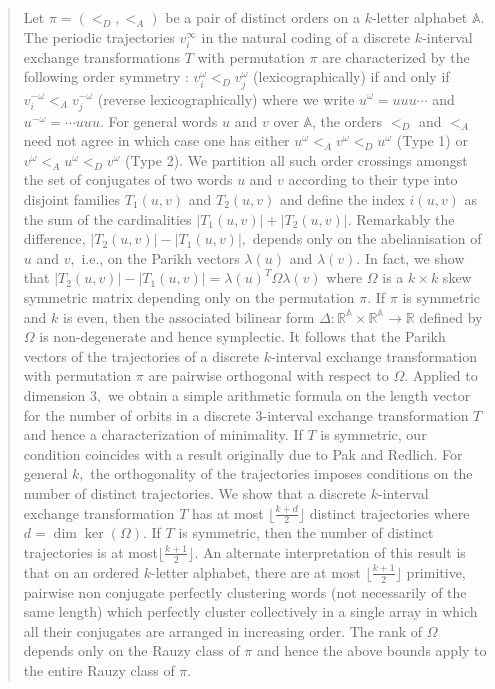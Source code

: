 \documentclass[12pt,a4paper]{amsart}
\newcommand{\reals}{{\mathbb R}}
\newcommand{\A}{{\mathbb A}}
\begin{document}
\begin{abstract} {Let $\pi=(<_D,<_A)$ be a pair of distinct orders on a $k$-letter alphabet $\A. $  The periodic trajectories $v_i^\infty $ in the natural coding of a discrete $k$-interval exchange transformations $T$ with permutation $\pi$ are characterized by the following order symmetry : $v_i^\omega <_D v_j^\omega$ (lexicographically) if and only if $v_i^{-\omega}<_Av_j^{-\omega}$ (reverse lexicographically) where we write $u^\omega=uuu\cdots$ and $u^{-\omega}=\cdots uuu.$   
For general words $u$ and $v$ over $\A$, the orders $<_D$ and $<_A$ need not agree in which case one has either $u^\omega<_A v^\omega<_D u^\omega$ (Type 1) or $v^\omega<_A u^\omega<_D v^\omega$ (Type 2).  We partition all such order crossings  amongst the set of conjugates of two words $u$ and $v$  according to their type into disjoint families  $T_1(u,v)$ and $T_2(u,v)$ and define the index $i(u,v)$ as the sum of the cardinalities $|T_1(u,v)|+|T_2(u,v)|.$ Remarkably the difference, $|T_2(u,v)|-|T_1(u,v)|,$ depends only on the abelianisation of $u$ and $v,$ i.e., on the Parikh vectors $\lambda(u)$ and $\lambda(v).$ In fact, we show that  $|T_2(u,v)|-|T_1(u,v)|=\lambda(u)^T \Omega \lambda(v)$ where $\Omega$ is a $k\times k$ skew symmetric  matrix depending only on the permutation $\pi.$  If $\pi$ is symmetric and $k$ is even, then the associated bilinear form $\Delta : \reals^\A \times \reals^\A \rightarrow \reals$ defined by $\Omega$ is non-degenerate and hence  symplectic.  It follows that the Parikh vectors of the trajectories of a discrete $k$-interval exchange transformation with permutation $\pi$  are  pairwise orthogonal with respect to $\Omega.$  
Applied to dimension $3,$ we obtain a simple arithmetic formula on the length vector for the number of orbits in a discrete $3$-interval exchange transformation $T$ and hence a characterization of minimality.  If $T$ is symmetric, our condition coincides with a result originally due to Pak and Redlich.  For general $k,$ the orthogonality of the trajectories imposes conditions on the number of distinct trajectories. We show that a discrete  $k$-interval exchange transformation $T$ has at most $\lfloor \frac{k+d}2 \rfloor$ distinct trajectories where $d=\dim \ker (\Omega).$  If $T$ is symmetric, then  the number of distinct trajectories is at most$\lfloor \frac{k+1}2 \rfloor.$ An alternate interpretation of this result is that on an ordered $k$-letter alphabet, there are at most $\lfloor \frac{k+1}2 \rfloor$ primitive, pairwise non conjugate perfectly clustering words (not necessarily of the same length) which perfectly cluster collectively in a single array in which all their conjugates are arranged in increasing order. The rank of $\Omega$ depends only on the Rauzy class of $\pi$ and hence the above bounds apply to the entire Rauzy class of $\pi.$  }\end{abstract} 
\maketitle 
\end{document}
